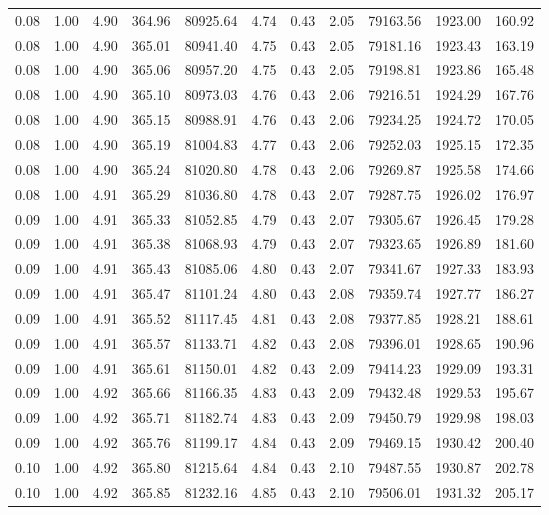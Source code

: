 \begin{table}[!ht]
\begin{tabular}{rrrrrrrrrrr}
0.08 & 1.00 & 4.90 & 364.96 & 80925.64 & 4.74 & 0.43 & 2.05 & 79163.56 & 1923.00 & 160.92 \\
0.08 & 1.00 & 4.90 & 365.01 & 80941.40 & 4.75 & 0.43 & 2.05 & 79181.16 & 1923.43 & 163.19 \\
0.08 & 1.00 & 4.90 & 365.06 & 80957.20 & 4.75 & 0.43 & 2.05 & 79198.81 & 1923.86 & 165.48 \\
0.08 & 1.00 & 4.90 & 365.10 & 80973.03 & 4.76 & 0.43 & 2.06 & 79216.51 & 1924.29 & 167.76 \\
0.08 & 1.00 & 4.90 & 365.15 & 80988.91 & 4.76 & 0.43 & 2.06 & 79234.25 & 1924.72 & 170.05 \\
0.08 & 1.00 & 4.90 & 365.19 & 81004.83 & 4.77 & 0.43 & 2.06 & 79252.03 & 1925.15 & 172.35 \\
0.08 & 1.00 & 4.90 & 365.24 & 81020.80 & 4.78 & 0.43 & 2.06 & 79269.87 & 1925.58 & 174.66 \\
0.08 & 1.00 & 4.91 & 365.29 & 81036.80 & 4.78 & 0.43 & 2.07 & 79287.75 & 1926.02 & 176.97 \\
0.09 & 1.00 & 4.91 & 365.33 & 81052.85 & 4.79 & 0.43 & 2.07 & 79305.67 & 1926.45 & 179.28 \\
0.09 & 1.00 & 4.91 & 365.38 & 81068.93 & 4.79 & 0.43 & 2.07 & 79323.65 & 1926.89 & 181.60 \\
0.09 & 1.00 & 4.91 & 365.43 & 81085.06 & 4.80 & 0.43 & 2.07 & 79341.67 & 1927.33 & 183.93 \\
0.09 & 1.00 & 4.91 & 365.47 & 81101.24 & 4.80 & 0.43 & 2.08 & 79359.74 & 1927.77 & 186.27 \\
0.09 & 1.00 & 4.91 & 365.52 & 81117.45 & 4.81 & 0.43 & 2.08 & 79377.85 & 1928.21 & 188.61 \\
0.09 & 1.00 & 4.91 & 365.57 & 81133.71 & 4.82 & 0.43 & 2.08 & 79396.01 & 1928.65 & 190.96 \\
0.09 & 1.00 & 4.91 & 365.61 & 81150.01 & 4.82 & 0.43 & 2.09 & 79414.23 & 1929.09 & 193.31 \\
0.09 & 1.00 & 4.92 & 365.66 & 81166.35 & 4.83 & 0.43 & 2.09 & 79432.48 & 1929.53 & 195.67 \\
0.09 & 1.00 & 4.92 & 365.71 & 81182.74 & 4.83 & 0.43 & 2.09 & 79450.79 & 1929.98 & 198.03 \\
0.09 & 1.00 & 4.92 & 365.76 & 81199.17 & 4.84 & 0.43 & 2.09 & 79469.15 & 1930.42 & 200.40 \\
0.10 & 1.00 & 4.92 & 365.80 & 81215.64 & 4.84 & 0.43 & 2.10 & 79487.55 & 1930.87 & 202.78 \\
0.10 & 1.00 & 4.92 & 365.85 & 81232.16 & 4.85 & 0.43 & 2.10 & 79506.01 & 1931.32 & 205.17 \\

\end{tabular}
\end{table}
